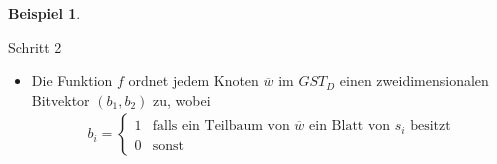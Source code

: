 \documentclass{beamer}
\newtheorem{exampleg}{Beispiel}
\begin{document}
\begin{frame}
\begin{exampleg}
\begin{figure}
\end{figure}
\end{exampleg}
\vspace{-5mm}
\begin{block}{Schritt 2}
\begin{itemize}
    \item Die Funktion $f$ ordnet jedem Knoten $\overline{w}$ im $GST_D$ einen zweidimensionalen Bitvektor $(b_1, b_2)$ zu, wobei
    \begin{gather*}
        b_i = \begin{cases}
            1 &\text{falls ein Teilbaum von } \overline{w} \text{ ein Blatt von } s_i \text{ besitzt} \\
            0 &\text{sonst}
        \end{cases}
    \end{gather*}
\end{itemize}
\end{block}
\end{frame}
\end{document}
